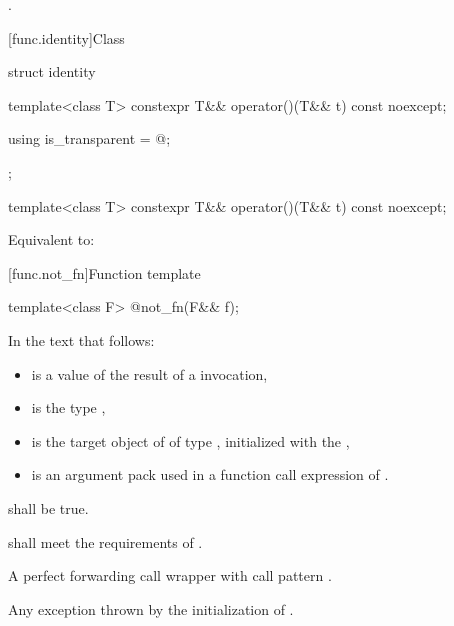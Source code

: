 \begin{itemdescr}
\pnum\returns {}.
\end{itemdescr}


[func.identity]{Class }

%
\begin{itemdecl}
struct identity {
  template<class T>
    constexpr T&& operator()(T&& t) const noexcept;

  using is_transparent = @\unspec@;
};

template<class T>
  constexpr T&& operator()(T&& t) const noexcept;
\end{itemdecl}

\begin{itemdescr}
\pnum
\effects
Equivalent to: 
\end{itemdescr}


[func.not_fn]{Function template }

%
\begin{itemdecl}
template<class F> @\unspec@ not_fn(F&& f);
\end{itemdecl}

\begin{itemdescr}
\pnum
In the text that follows:
\begin{itemize}
\item {} is a value of the result of a  invocation,
\item {} is the type ,
\item {} is the target object of 
  of type ,
  initialized with
  the  ,
\item {} is an argument pack
  used in a function call expression of .
\end{itemize}

\pnum
\mandates
{}
shall be true.

\pnum
\expects
{} shall meet the requirements of .

\pnum
\returns
A perfect forwarding call wrapper 
with call pattern .

\pnum
\throws
Any exception thrown by the initialization of .
\end{itemdescr}

